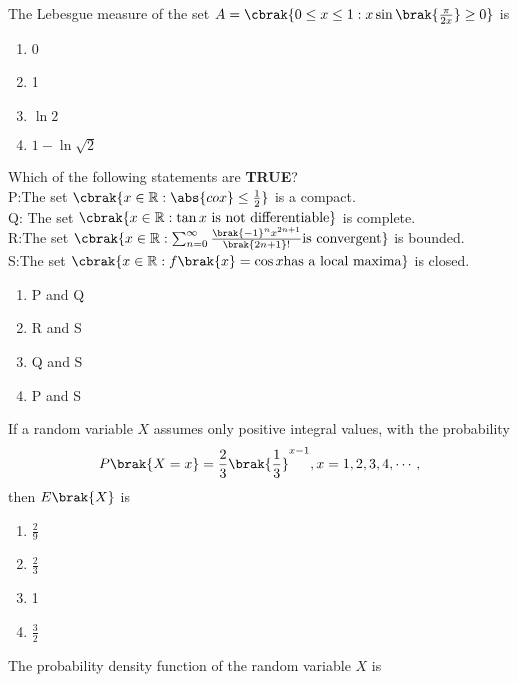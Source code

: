 \iffalse
\chapter{2012}
\author{AI24BTECH11011}
\section{ae}
\fi


	\item The Lebesgue measure of the set $A=\cbrak{0\leq x\leq 1:x\sin\brak{\frac{\pi}{2x}}\geq 0}$ is
    \begin{enumerate}
        \item 0
        \item 1
        \item $\ln 2$
        \item $1-\ln\sqrt{2}$
    \end{enumerate}
    \item Which of the following statements are \textbf{TRUE}?\\
    P:The set $\cbrak{x \in \mathbb{R}:\abs{cox}\leq \frac{1}{2}}$ is a compact.\\
    Q: The set $\cbrak{x \in \mathbb{R}:\tan x \text{ is not differentiable}}$ is complete.\\
    R:The set $\cbrak{x \in \mathbb{R}:\sum_{n=0}^{\infty}\frac{\brak{-1}^nx^{2n+1}}{\brak{2n+1}!}\text{is convergent}} $ is bounded.\\
    S:The set $\cbrak{x \in \mathbb{R}:f\brak{x}=\cos x \text{has a local maxima}}$ is closed.
    \begin{enumerate}
        \item P and Q
        \item R and S
        \item Q and S
        \item P and S
    \end{enumerate}
    \item If a random variable $X$ assumes only positive integral values, with the probability $$P\brak{X=x}=\frac{2}{3}\brak{\frac{1}{3}}^{x-1},x=1,2,3,4,\cdots,$$ then $E\brak{X}$ is
    \begin{enumerate}
        \item $\frac{2}{9}$
        \item $\frac{2}{3}$
        \item 1
        \item $\frac{3}{2}$
    \end{enumerate}
    \item The probability density function of the random variable $X$ is
